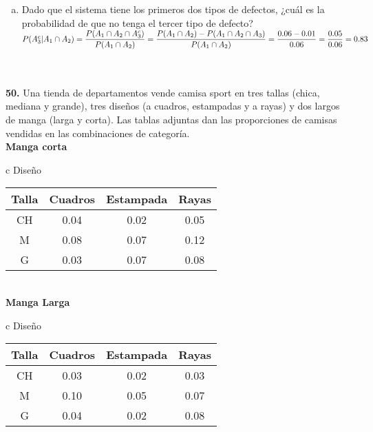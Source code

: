 \documentclass[12pt, letterpaper, spanish]{article}
\begin{document}
\begin{enumerate}[a)]
    $P((A_1\cup A_2\cup A_3)\cap ((A_1^c\cap A_2^c)\cup (A_1^c\cap A_3^c)\cup (A_2^c\cap A_3^c))|A_1\cup A_2\cup A_3)=\displaystyle\frac{(A_1\cup A_2\cup A_3)\cap ((A_1^c\cap A_2^c)\cup (A_1^c\cap A_3^c)\cup (A_2^c\cap A_3^c))}{A_1\cup A_2\cup A_3}=\displaystyle\frac{0.05}{0.14}=0.35$
    \item Dado que el sistema tiene los primeros dos tipos de defectos, ¿cuál es la probabilidad de que no tenga el tercer tipo de defecto?\\
    $P(A_3^c|A_1\cap A_2)=\displaystyle\frac{P(A_1\cap A_2\cap A_3^c)}{P(A_1\cap A_2)}=\displaystyle\frac{P(A_1\cap A_2)-P(A_1\cap A_2\cap A_3)}{P(A_1\cap A_2)}=\\ \displaystyle\frac{0.06-0.01}{0.06}=\displaystyle\frac{0.05}{0.06}=0.83$
\end{enumerate}\\\\

\textbf{50.} Una tienda de departamentos vende camisa sport en tres tallas (chica, mediana y grande), tres diseños (a cuadros, estampadas y a rayas) y dos largos de manga (larga y corta). Las tablas adjuntas dan las proporciones de camisas vendidas en las combinaciones de categoría.\\

\textbf{Manga corta}\\
\begin{tabular}{c}
    \hline
    Diseño \\
    \begin{tabular}{cccc}
        \hline
        Talla & Cuadros & Estampada & Rayas\\ \hline
        CH & 0.04 & 0.02 & 0.05\\
        M & 0.08 & 0.07 & 0.12\\
        G & 0.03 & 0.07 & 0.08
    \end{tabular}
\end{tabular}\\

\textbf{Manga Larga}\\
\begin{tabular}{c}
    \hline
    Diseño \\
    \begin{tabular}{cccc}
        \hline
        Talla & Cuadros & Estampada & Rayas\\ \hline
        CH & 0.03 & 0.02 & 0.03\\
        M & 0.10 & 0.05 & 0.07\\
        G & 0.04 & 0.02 & 0.08
    \end{tabular}
\end{tabular}
\end{document}
